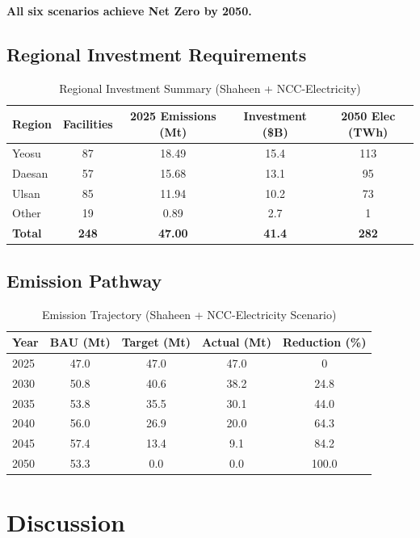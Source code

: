 \documentclass[12pt,a4paper]{article}
\begin{document}
\textbf{All six scenarios achieve Net Zero by 2050.}

\subsection{Regional Investment Requirements}

\begin{table}[H]
\centering
\caption{Regional Investment Summary (Shaheen + NCC-Electricity)}
\begin{tabular}{lcccc}
\toprule
Region & Facilities & 2025 Emissions (Mt) & Investment (\$B) & 2050 Elec (TWh) \\
\midrule
Yeosu & 87 & 18.49 & 15.4 & 113 \\
Daesan & 57 & 15.68 & 13.1 & 95 \\
Ulsan & 85 & 11.94 & 10.2 & 73 \\
Other & 19 & 0.89 & 2.7 & 1 \\
\midrule
\textbf{Total} & \textbf{248} & \textbf{47.00} & \textbf{41.4} & \textbf{282} \\
\bottomrule
\end{tabular}
\end{table}

\subsection{Emission Pathway}

\begin{table}[H]
\centering
\caption{Emission Trajectory (Shaheen + NCC-Electricity Scenario)}
\begin{tabular}{lcccc}
\toprule
Year & BAU (Mt) & Target (Mt) & Actual (Mt) & Reduction (\%) \\
\midrule
2025 & 47.0 & 47.0 & 47.0 & 0 \\
2030 & 50.8 & 40.6 & 38.2 & 24.8 \\
2035 & 53.8 & 35.5 & 30.1 & 44.0 \\
2040 & 56.0 & 26.9 & 20.0 & 64.3 \\
2045 & 57.4 & 13.4 & 9.1 & 84.2 \\
2050 & 53.3 & 0.0 & 0.0 & 100.0 \\
\bottomrule
\end{tabular}
\end{table}

\section{Discussion}
\end{document}
